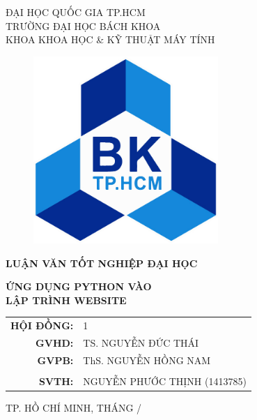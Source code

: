 \begin{titlepage}
	\begin{center}
		\large ĐẠI HỌC QUỐC GIA TP.HCM\\TRƯỜNG ĐẠI HỌC BÁCH KHOA\\KHOA KHOA HỌC \& KỸ THUẬT MÁY TÍNH
	\end{center}
	\begin{figure}[!ht]
		\begin{center}
			\includegraphics[width=70mm]{images/logobk.jpg}
		\end{center}
	\end{figure}
	\begin{center}
		\textbf{\large LUẬN VĂN TỐT NGHIỆP ĐẠI HỌC}
	\end{center}
	\vspace{5mm}
	\begin{center}
		\textbf{\Huge ỨNG DỤNG PYTHON VÀO\\LẬP TRÌNH WEBSITE}
	\end{center}
	\vspace{5mm}
	\begin{table}[!ht]
		\raggedleft
		\large
		\begin{tabular}{rl}
			\textbf{HỘI ĐỒNG:} & 1\\
			\textbf{GVHD:} & TS. NGUYỄN ĐỨC THÁI\\
			\textbf{GVPB:} & ThS. NGUYỄN HỒNG NAM\\
			\\
			\textbf{SVTH:} & NGUYỄN PHƯỚC THỊNH (1413785)\\
		\end{tabular}
	\end{table}
	\vfill
	\begin{center}
		\large TP. HỒ CHÍ MINH, THÁNG \the\month /\the\year
	\end{center}
\end{titlepage}